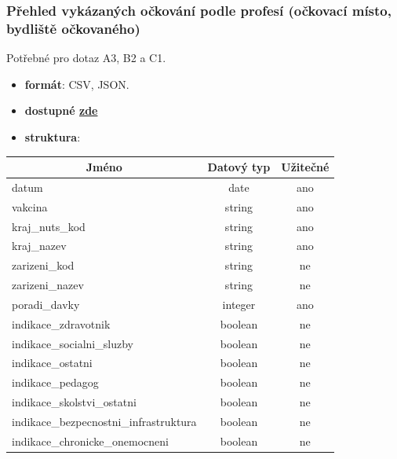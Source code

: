 \documentclass[12pt]{article}
\begin{document}
\subsubsection*{Přehled vykázaných očkování podle profesí (očkovací místo, bydliště očkovaného)}
Potřebné pro dotaz A3, B2 a C1.
\begin{itemize}
    \item \textbf{formát}: CSV, JSON.
    \item \textbf{dostupné \href{https://onemocneni-aktualne.mzcr.cz/api/v2/covid-19/ockovani-profese.csv}{zde}}
    \item \textbf{struktura}:
\end{itemize}
        \begin{center}
            \begin{tabular}{ |l|c|c| } 
                \hline
                \multicolumn{1}{|c|}{Jméno} & Datový typ & Užitečné \\
                \hline
                \hline
                datum & date & ano \\ 
                \hline
                vakcina & string & ano \\ 
                \hline
                kraj\_nuts\_kod & string & ano \\ 
                \hline
                kraj\_nazev & string & ano \\ 
                \hline
                zarizeni\_kod & string & ne \\ 
                \hline
                zarizeni\_nazev & string & ne \\ 
                \hline
                poradi\_davky & integer & ano \\ 
                \hline
                indikace\_zdravotnik & boolean & ne \\ 
                \hline
                indikace\_socialni\_sluzby & boolean & ne \\ 
                \hline
                indikace\_ostatni & boolean & ne \\ 
                \hline
                indikace\_pedagog & boolean & ne \\ 
                \hline
                indikace\_skolstvi\_ostatni & boolean & ne \\ 
                \hline
                indikace\_bezpecnostni\_infrastruktura & boolean & ne \\ 
                \hline
                indikace\_chronicke\_onemocneni & boolean & ne \\ 

\end{tabular}
\end{center}
\end{document}

